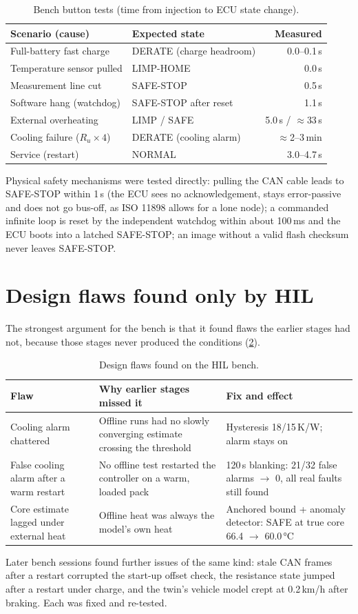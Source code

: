 \begin{table}[htbp]\centering\small
\caption{Bench button tests (time from injection to ECU state change).}\label{tab:bench}
\begin{tabular}{@{}llr@{}}\toprule
Scenario (cause) & Expected state & Measured \\\midrule
Full-battery fast charge & DERATE (charge headroom) & 0.0--0.1\,s \\
Temperature sensor pulled & LIMP-HOME & 0.0\,s \\
Measurement line cut & SAFE-STOP & 0.5\,s \\
Software hang (watchdog) & SAFE-STOP after reset & 1.1\,s \\
External overheating & LIMP / SAFE & 5.0\,s / $\approx$33\,s \\
Cooling failure ($R_u \times 4$) & DERATE (cooling alarm) & $\approx$2--3\,min \\
Service (restart) & NORMAL & 3.0--4.7\,s \\\bottomrule
\end{tabular}
\end{table}

Physical safety mechanisms were tested directly: pulling the CAN cable leads to SAFE-STOP within 1\,s (the ECU sees no acknowledgement, stays error-passive and does not go bus-off, as ISO 11898 allows for a lone node); a commanded infinite loop is reset by the independent watchdog within about 100\,ms and the ECU boots into a latched SAFE-STOP; an image without a valid flash checksum never leaves SAFE-STOP.

\section{Design flaws found only by HIL}\label{sec:flaws}
The strongest argument for the bench is that it found flaws the earlier stages had not, because those stages never produced the conditions (\cref{tab:flaws}).

\begin{table}[htbp]\centering\small
\caption{Design flaws found on the HIL bench.}\label{tab:flaws}
\begin{tabularx}{\linewidth}{@{}lXX@{}}\toprule
Flaw & Why earlier stages missed it & Fix and effect \\\midrule
Cooling alarm chattered & Offline runs had no slowly converging estimate crossing the threshold & Hysteresis 18/15\,K/W; alarm stays on \\
False cooling alarm after a warm restart & No offline test restarted the controller on a warm, loaded pack & 120\,s blanking: 21/32 false alarms $\to$ 0, all real faults still found \\
Core estimate lagged under external heat & Offline heat was always the model's own heat & Anchored bound + anomaly detector: SAFE at true core 66.4 $\to$ 60.0\,°C \\\bottomrule
\end{tabularx}
\end{table}

Later bench sessions found further issues of the same kind: stale CAN frames after a restart corrupted the start-up offset check, the resistance state jumped after a restart under charge, and the twin's vehicle model crept at 0.2\,km/h after braking. Each was fixed and re-tested.
